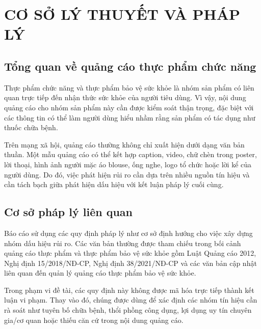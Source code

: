\chapter{CƠ SỞ LÝ THUYẾT VÀ PHÁP LÝ}

\section{Tổng quan về quảng cáo thực phẩm chức năng}
Thực phẩm chức năng và thực phẩm bảo vệ sức khỏe là nhóm sản phẩm có liên quan trực tiếp đến nhận thức sức khỏe của người tiêu dùng. Vì vậy, nội dung quảng cáo cho nhóm sản phẩm này cần được kiểm soát thận trọng, đặc biệt với các thông tin có thể làm người dùng hiểu nhầm rằng sản phẩm có tác dụng như thuốc chữa bệnh.

Trên mạng xã hội, quảng cáo thường không chỉ xuất hiện dưới dạng văn bản thuần. Một mẫu quảng cáo có thể kết hợp caption, video, chữ chèn trong poster, lời thoại, hình ảnh người mặc áo blouse, ống nghe, logo tổ chức hoặc lời kể của người dùng. Do đó, việc phát hiện rủi ro cần dựa trên nhiều nguồn tín hiệu và cần tách bạch giữa phát hiện dấu hiệu với kết luận pháp lý cuối cùng.

\section{Cơ sở pháp lý liên quan}
Báo cáo sử dụng các quy định pháp lý như cơ sở định hướng cho việc xây dựng nhóm dấu hiệu rủi ro. Các văn bản thường được tham chiếu trong bối cảnh quảng cáo thực phẩm và thực phẩm bảo vệ sức khỏe gồm Luật Quảng cáo 2012, Nghị định 15/2018/NĐ-CP, Nghị định 38/2021/NĐ-CP và các văn bản cập nhật liên quan đến quản lý quảng cáo thực phẩm bảo vệ sức khỏe.

Trong phạm vi đề tài, các quy định này không được mã hóa trực tiếp thành kết luận vi phạm. Thay vào đó, chúng được dùng để xác định các nhóm tín hiệu cần rà soát như tuyên bố chữa bệnh, thổi phồng công dụng, lợi dụng uy tín chuyên gia/cơ quan hoặc thiếu căn cứ trong nội dung quảng cáo.

